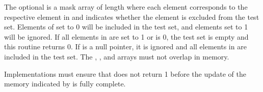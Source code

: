 \begin{apidefinition}
{    The optional  is a mask array of length  where each element
    corresponds to the respective element in  and indicates whether
    the element is excluded from the test set.  Elements of  set to
    0 will be included in the test set, and elements set to 1 will be ignored.  If all elements
    in  are set to 1 or  is 0, the test set is empty
    and this routine returns 0.  If  is a null pointer, it is
    ignored and all elements in  are included in the test set.  The
    , , and  arrays must not overlap in
    memory.

    Implementations must ensure that  does not
    return 1 before the update of the memory indicated by  is fully
    complete.
}



\end{apidefinition}
